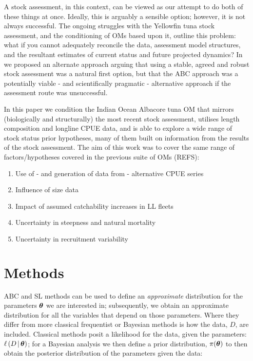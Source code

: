 \documentclass[11pt]{article}
\newcommand{\xtheta}{\mbox{\boldmath$\theta$}}
\begin{document}
A stock assessment, in this context, can be viewed as our attempt to do both of these things at once. Ideally, this is arguably a sensible option; however, it is not always successful. The ongoing struggles with the Yellowfin tuna stock assessment, and the conditioning of OMs based upon it, outline this problem: what if you cannot adequately reconcile the data, assessment model structures, and the resultant estimates of current status and future projected dynamics? In \cite{om21} we proposed an alternate approach arguing that using a stable, agreed and robust stock assessment was a natural first option, but that the ABC approach was a potentially viable - and scientifically pragmatic - alternative approach if the assessment route was unsuccessful.

In this paper we condition the Indian Ocean Albacore tuna OM that mirrors (biologically and structurally) the most recent stock assessment, utilises length composition and longline CPUE data, and is able to explore a wide range of stock status prior hypotheses, many of them built on information from the results of the stock assessment. The aim of this work was to cover the
same range of factors/hypotheses covered in the previous suite of OMs (REFS):

\begin{enumerate}
    \item Use of - and generation of data from - alternative CPUE series
    \item Influence of size data
    \item Impact of assumed catchability increases in LL fleets
    \item Uncertainty in steepness and natural mortality
    \item Uncertainty in recruitment variability
\end{enumerate}

\section{Methods}

ABC \cite{abc} and SL \cite{synlkhd} methods can be used to define an \emph{approximate} distribution for the parameters $\xtheta$ we are interested in; subsequently, we obtain an approximate distribution for all the variables that depend on those parameters. Where they differ from more classical frequentist or Bayesian methods is how the data, $D$, are included. Classical methods posit a likelihood for the data, given the parameters: $\ell\left(D\,|\,\xtheta\right)$; for a Bayesian analysis we then define a prior distribution, $\pi(\xtheta)$ to then obtain the posterior distribution of the parameters given the data:
\end{document}
